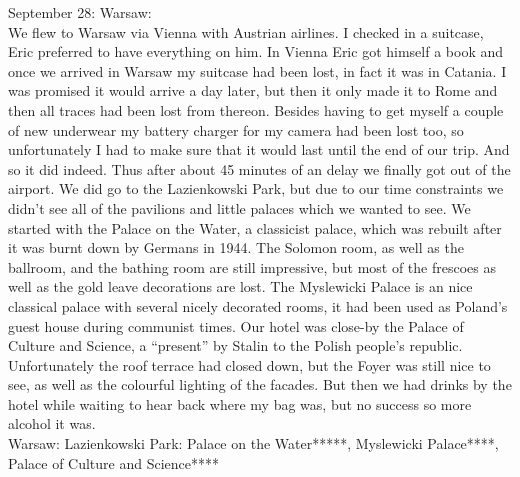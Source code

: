 September 28: Warsaw:\\
We flew to Warsaw via Vienna with Austrian airlines. I checked in a suitcase, Eric preferred to have everything on him. In Vienna Eric got himself a book and once we arrived in Warsaw my suitcase had been lost, in fact it was in Catania. I was promised it would arrive a day later, but then it only made it to Rome and then all traces had been lost from thereon. Besides having to get myself a couple of new underwear my battery charger for my camera had been lost too, so unfortunately I had to make sure that it would last until the end of our trip. And so it did indeed. Thus after about 45 minutes of an delay we finally got out of the airport. We did go to the Lazienkowski Park, but due to our time constraints we didn't see all of the pavilions and little palaces which we wanted to see. We started with the Palace on the Water, a classicist palace, which was rebuilt after it was burnt down by Germans in 1944. The Solomon room, as well as the ballroom, and the bathing room are still impressive, but most of the frescoes as well as the gold leave decorations are lost. The Myslewicki Palace is an nice classical palace with several nicely decorated rooms, it had been used as Poland's guest house during communist times. Our hotel was close-by the Palace of Culture and Science, a ``present'' by Stalin to the Polish people's republic. Unfortunately the roof terrace had closed down, but the Foyer was still nice to see, as well as the colourful lighting of the facades. But then we had drinks by the hotel while waiting to hear back where my bag was, but no success so more alcohol it was.\\

Warsaw: Lazienkowski Park: Palace on the Water*****, Myslewicki Palace****, Palace of Culture and Science****\\

